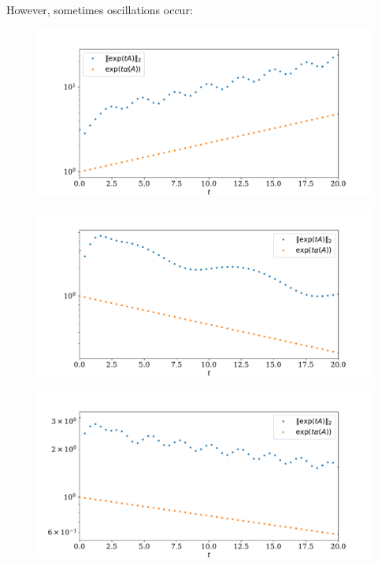 \documentclass[a4paper, 11pt]{article}
\begin{document}
However, sometimes oscillations occur:
\begin{figure}[H]
  \centering
  \includegraphics[width=\textwidth]{../24_3/nice_1.pdf}
\end{figure}
\begin{figure}[H]
  \centering
  \includegraphics[width=\textwidth]{../24_3/nice_2.pdf}
\end{figure}
\begin{figure}[H]
  \centering
  \includegraphics[width=\textwidth]{../24_3/nice_3.pdf}
\end{figure}
\end{document}
